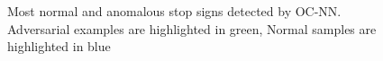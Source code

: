\begin{figure}
\hspace{0.5cm}
\caption{Most normal and anomalous stop signs detected by OC-NN.  Adversarial examples are highlighted in green, Normal samples are highlighted in blue}
\label{fig:gtsrbocnnresults}
\end{figure}
